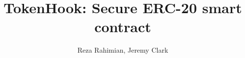 \documentclass[envcountsect]{llncs}
\newcommand{\sys}{\textsf{TokenHook}\xspace}
\newcommand{\erc}{ERC-20\xspace}
\begin{document}
\frontmatter
\mainmatter

\title{\Large \bf \sys : Secure \erc smart contract}
\author{Reza Rahimian, Jeremy Clark}

\maketitle














{\footnotesize}

\end{document}
